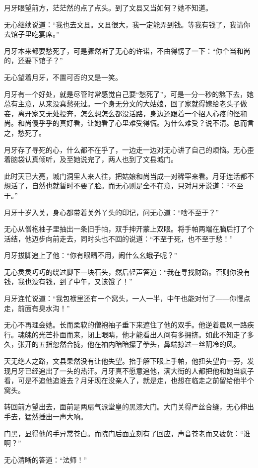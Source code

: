 月牙眼望前方，茫茫然的点了点头。到了文县又当如何？她不知道。

无心继续说道：``我也去文县。文县很大，我一定能弄到钱。等我有钱了，我请你去馆子里吃宴席。''

月牙本来都要愁死了，可是骤然听了无心的许诺，不由得愣了一下：``你个当和尚的，还要下馆子？''

无心望着月牙，不置可否的又是一笑。

月牙有一个好处，就是尽管时常感觉自己要``愁死了''，可是一分一秒的熬下去，她总有主意，从来没真愁死过。一个身无分文的大姑娘，回了家就得嫁给老头子做妾，离开家又无处投奔，怎么想怎么都没活路，身边还跟着一个招人心疼的怪和尚。和尚傻乎乎的真好看，让她看了心里难受得慌。为什么难受？说不清。总而言之，愁死了。

月牙存了寻死的心，什么都不在乎了，一边走一边对无心讲了自己的烦恼。无心歪着脑袋认真倾听，及至她说完了，两人也到了文县城门。

此时天已大亮，城门洞里人来人往，把姑娘和尚当成一对稀罕来看。月牙连活都不想活了，自然也就暂时不要了脸。而无心则是全不在意，只对月牙说道：``不至于。''

月牙十岁入关，身心都带着关外丫头的印记，问无心道：``啥不至于？''

无心从僧袍袖子里抽出一条旧手帕，双手抻开蒙上双眼。将手帕两端在脑后打了个活结，他迈步向前走去，同时头也不回的说道：``不至于死，也不至于愁！''

月牙拔脚追上了他：``你有眼睛不用，闹什么幺蛾子呢？''

无心灵灵巧巧的绕过脚下一块石头，然后轻声答道：``我在寻找财路。否则你没有钱，我也没有钱，到了中午，又该饿了！''

月牙连忙说道：``我包袱里还有一个窝头，一人一半，中午也能对付了——你慢点走，前面有臭水沟！''

无心不再理会她。长而柔软的僧袍袖子垂下来遮住了他的双手。他逆着晨风一路疾行。魂魄的光芒扑面而来，闭上眼睛，他才能看出人间有多拥挤。如此不知走了多久，张开的五指忽然合拢，他在袖内暗暗攥了拳头，鼻端掠过一丝阴冷的风。

天无绝人之路，文县果然没有让他失望。抬手解下眼上手帕，他扭头望向一旁，发现月牙已经追出了一头的热汗。月牙真不愿意追他，满大街的人都把他和她当疯子看，可是不追他追谁去？月牙现在没亲人了，就是走，也想在临走之前留给他半个窝头。

转回前方望出去，面前是两扇气派堂皇的黑漆大门。大门关得严丝合缝，无心伸出手去，猛然捶出一声大响。

门黑，显得他的手异常苍白。而院门后面立刻有了回应，声音苍老而又疲惫：``谁啊？''

无心清晰的答道：``法师！''

